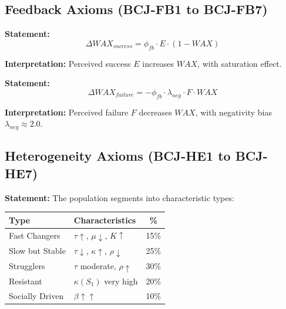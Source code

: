 \subsection{Feedback Axioms (BCJ-FB1 to BCJ-FB7)}

\begin{tcolorbox}[colback=gray!5!white, colframe=gray!75!black,
    title=Axiom BCJ-FB2: Success Feedback]
\textbf{Statement:}
\begin{equation}
\Delta WAX_{success} = \phi_{fb} \cdot E \cdot (1 - WAX)
\end{equation}

\textbf{Interpretation:} Perceived success $E$ increases $WAX$, with saturation effect.
\end{tcolorbox}

\begin{tcolorbox}[colback=gray!5!white, colframe=gray!75!black,
    title=Axiom BCJ-FB3: Failure Feedback]
\textbf{Statement:}
\begin{equation}
\Delta WAX_{failure} = -\phi_{fb} \cdot \lambda_{neg} \cdot F \cdot WAX
\end{equation}

\textbf{Interpretation:} Perceived failure $F$ decreases $WAX$, with negativity bias $\lambda_{neg} \approx 2.0$.
\end{tcolorbox}

\subsection{Heterogeneity Axioms (BCJ-HE1 to BCJ-HE7)}

\begin{tcolorbox}[colback=gray!5!white, colframe=gray!75!black,
    title=Axiom BCJ-HE4: Population Segments]
\textbf{Statement:} The population segments into characteristic types:

\begin{center}
\begin{tabular}{llc}
\textbf{Type} & \textbf{Characteristics} & \textbf{\%} \\
\hline
Fast Changers & $\tau \uparrow$, $\mu \downarrow$, $K \uparrow$ & 15\% \\
Slow but Stable & $\tau \downarrow$, $\kappa \uparrow$, $\rho \downarrow$ & 25\% \\
Strugglers & $\tau$ moderate, $\rho \uparrow$ & 30\% \\
Resistant & $\kappa(S_1)$ very high & 20\% \\
Socially Driven & $\beta \uparrow\uparrow$ & 10\% \\
\end{tabular}
\end{center}
\end{tcolorbox}

